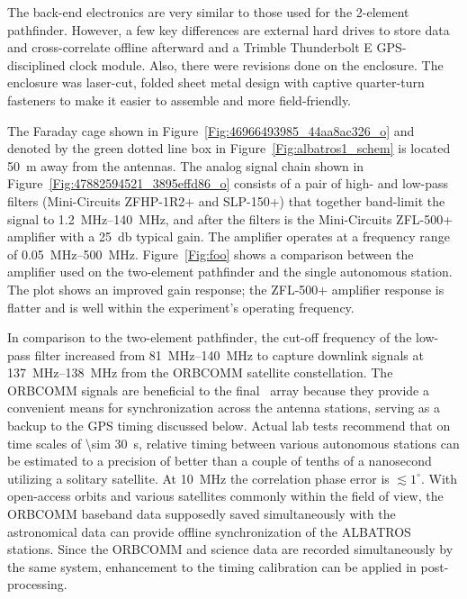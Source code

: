 The back-end electronics are very similar to those used for the 2-element pathfinder. However, a few key differences are external hard drives to store data and cross-correlate offline afterward and a Trimble Thunderbolt E GPS-disciplined clock module. Also, there were revisions done on the enclosure. The enclosure was laser-cut, folded sheet metal design with captive quarter-turn fasteners to make it easier to assemble and more field-friendly.

The Faraday cage shown in Figure~\ref{Fig:46966493985_44aa8ac326_o} and denoted by the green dotted line box in Figure~\ref{Fig:albatros1_schem} is located \SI{50}{\meter} away from the antennas. The analog signal chain shown in Figure~\ref{Fig:47882594521_3895effd86_o} consists of a pair of high- and low-pass filters (Mini-Circuits ZFHP-1R2+ and SLP-150+) that together band-limit the signal to \SIrange{1.2}{140}{\mega\hertz}, and after the filters is the Mini-Circuits ZFL-500+ amplifier with a \SI{25}{\decibel} typical gain. The amplifier operates at a frequency range of \SIrange{0.05}{500}{\mega\hertz}. Figure~\ref{Fig:foo} shows a comparison between the amplifier used on the two-element pathfinder and the single autonomous station. The plot shows an improved gain response; the ZFL-500+ amplifier response is flatter and is well within the experiment's operating frequency.

In comparison to the two-element pathfinder, the cut-off frequency of the low-pass filter increased from \SIrange{81}{140}{\mega\hertz} to capture downlink signals at \SIrange{137}{138}{\mega\hertz} from the ORBCOMM satellite constellation. The ORBCOMM signals are beneficial to the final \albatros\ array because they provide a convenient means for synchronization across the antenna stations, serving as a backup to the GPS timing discussed below. Actual lab tests recommend that on time scales of \SI{\sim 30}{\second}, relative timing between various autonomous stations can be estimated to a precision of better than a couple of tenths of a nanosecond utilizing a solitary satellite. At \SI{10}{\mega\hertz} the correlation phase error is $\lesssim1^\circ$. With open-access orbits and various satellites commonly within the field of view, the ORBCOMM baseband data supposedly saved simultaneously with the astronomical data can provide offline synchronization of the ALBATROS stations. Since the ORBCOMM and science data are recorded simultaneously by the same system, enhancement to the timing calibration can be applied in post-processing.

